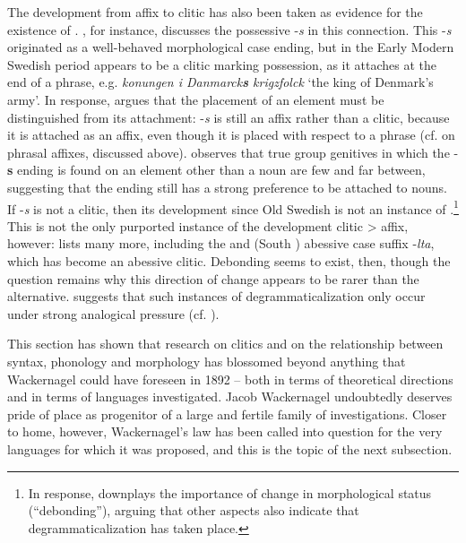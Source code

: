 \documentclass[output=paper]{../langscibook}
\begin{document}
The development from affix to clitic has also been taken as evidence for the existence of . \citet{Norde2001}, for instance, discusses the  possessive -\textit{s} in this connection. This -\textit{s} originated as a well-behaved morphological  case ending, but in the Early Modern Swedish period appears to be a clitic marking possession, as it attaches at the end of a phrase, e.g. \textit{konungen i Danmarck\textbf{s} krigzfolck} `the king of Denmark's army'. In response, \citet{Boerjars2003} argues that the placement of an element must be distinguished from its attachment:  -\textit{s} is still an affix rather than a clitic, because it is attached as an affix, even though it is placed with respect to a phrase (cf. \citet{Anderson1993} on phrasal affixes, discussed above). \citeauthor{Boerjars2003} observes that true group genitives in which the -\textbf{s} ending is found on an element other than a noun are few and far between, suggesting that the ending still has a strong preference to be attached to nouns. If -\textit{s} is not a clitic, then its development since Old Swedish is not an instance of .\footnote{In response, \citet{Norde2010} downplays the importance of change in morphological status (``debonding''), arguing that other aspects also indicate that degrammaticalization has taken place.} This is not the only purported instance of the development clitic > affix, however: \citet{Kiparsky2012} lists many more, including the  and  (South ) abessive case suffix -\textit{lta}, which has become an abessive clitic. Debonding seems to exist, then, though the question remains why this direction of change appears to be rarer than the alternative. \citet{Kiparsky2012} suggests that such instances of degrammaticalization only occur under strong analogical pressure (cf. \citealp{Plank1995}).

This section has shown that research on clitics and on the relationship between syntax, phonology and morphology has blossomed beyond anything that Wackernagel could have foreseen in 1892 -- both in terms of theoretical directions and in terms of languages investigated. Jacob Wackernagel undoubtedly deserves pride of place as progenitor of a large and fertile family of investigations. Closer to home, however, Wackernagel's law has been called into question for the very languages for which it was proposed, and this is the topic of the next subsection.
\end{document}
